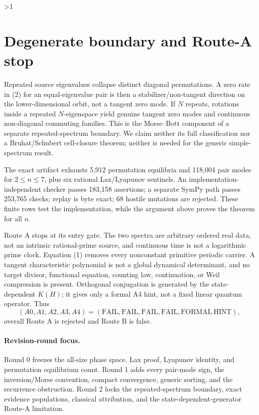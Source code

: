 \documentclass[9pt]{extarticle}
\begin{document}
\ifnum\CRevisionRound>1
\section{Degenerate boundary and Route-A stop}
Repeated source eigenvalues collapse distinct diagonal permutations.  A zero
rate in (2) for an equal-eigenvalue pair is then a stabilizer/non-tangent
direction on the lower-dimensional orbit, not a tangent zero mode.  If $N$
repeats, rotations inside a repeated $N$-eigenspace yield genuine tangent zero
modes and continuous non-diagonal commuting families.  This is the
Morse--Bott component of a separate repeated-spectrum boundary.  We claim
neither its full classification nor a Bruhat/Schubert cell-closure theorem;
neither is needed for the generic simple-spectrum result.

The exact artifact exhausts 5{,}912 permutation equilibria and 118{,}004 pair
modes for $2\le n\le7$, plus six rational Lax/Lyapunov sentinels.  An
implementation-independent checker passes 183{,}158 assertions; a separate
SymPy path passes 253{,}765 checks; replay is byte exact; 68 hostile mutations
are rejected.  These finite rows test the implementation, while the argument
above proves the theorem for all $n$.

Route A stops at its entry gate.  The two spectra are arbitrary ordered real
data, not an intrinsic rational-prime source, and continuous time is not a
logarithmic prime clock.  Equation (1) removes every nonconstant primitive
periodic carrier.  A tangent characteristic polynomial is not a global
dynamical determinant, and no target divisor, functional equation, counting
law, continuation, or Weil compression is present.  Orthogonal conjugation is
generated by the state-dependent $K(H)$; it gives only a formal A4 hint, not a
fixed linear quantum operator.  Thus
\[
 (A0,A1,A2,A3,A4)=(\mathrm{FAIL},\mathrm{FAIL},\mathrm{FAIL},
 \mathrm{FAIL},\mathrm{FORMAL\ HINT}),
\]
overall Route A is rejected and Route B is false.
\fi

\paragraph{Revision-round focus.}
\ifcase\CRevisionRound
Round 0 freezes the all-size phase space, Lax proof, Lyapunov identity, and
permutation equilibrium count.
\or
Round 1 adds every pair-mode sign, the inversion/Morse convention, compact
convergence, generic sorting, and the recurrence obstruction.
\or
Round 2 locks the repeated-spectrum boundary, exact evidence populations,
classical attribution, and the state-dependent-generator Route-A limitation.
\fi
\end{document}
